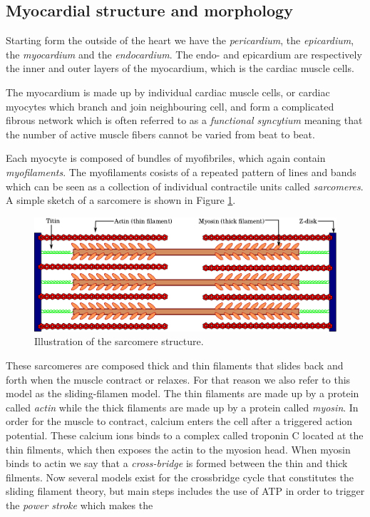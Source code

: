 \subsection{Myocardial structure and morphology}

Starting form the outside of the heart we have the \emph{pericardium},
the \emph{epicardium}, the \emph{myocardium} and the \emph{endocardium}. 
The endo- and epicardium are respectively the inner and outer layers of the
myocardium, which is the cardiac muscle cells.

The myocardium is made up by individual cardiac muscle cells, or
cardiac myocytes which branch and join neighbouring cell, and form a
complicated fibrous network which is often referred to as a
\emph{functional syncytium} meaning that the number of active muscle
fibers cannot be varied from beat to beat. 


Each myocyte is composed of bundles of myofibriles, which again
contain \emph{myofilaments}. The myofilaments cosists of a repeated pattern
of lines and bands which can be seen as a collection of individual
contractile units called \emph{sarcomeres}. A simple sketch of a
sarcomere is shown in Figure \ref{fig:sarcomere}.

\begin{figure}[htbp]
  \centering
    \includegraphics[width=1.0\textwidth]{chapters/introduction/figures/Sarcomere.png}
\caption{Illustration of the sarcomere structure.}
\label{fig:sarcomere}
\end{figure}

These sarcomeres are composed thick and thin filaments that slides
back and forth when the muscle contract or relaxes. For that reason we
also refer to this model as the sliding-filamen model. 
The thin filaments are made up by a protein called \emph{actin} while
the thick filaments are made up by a protein called \emph{myosin}.
In order for the muscle to contract, calcium enters the cell after a
triggered action potential. These calcium ions binds to a complex called
troponin C located at the thin filments, which then exposes the actin to the
myosion head. When myosin binds to actin we say that a
\emph{cross-bridge} is formed between the thin and thick
filments. Now several models exist for the crossbridge cycle that
constitutes the sliding filament theory, but main steps includes the
use of ATP in order to trigger the \emph{power stroke} which makes the 

